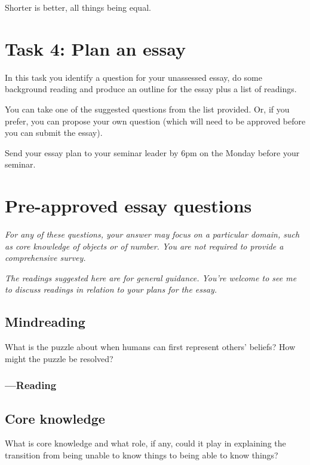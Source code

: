 \documentclass[12pt,\papersize]{extarticle}
\begin{document}
Shorter is better, all things being equal.





\clearpage
\section{Task 4: Plan an essay}
In this task you identify a question for your unassessed essay, do some background reading and produce an outline for the essay plus a list of readings.

You can take one of the suggested questions from the list provided.  Or, if you prefer, you can propose your own question (which will need to be approved before you can submit the essay).

Send your essay plan to your seminar leader by 6pm on the Monday before your seminar.



\clearpage
\section{Pre-approved essay questions}

\textit{For any of these questions, your answer may focus on a particular domain, such as core knowledge of objects or of number.  You are not required to provide a comprehensive survey.}

\emph{The readings suggested here are for general guidance.  You’re welcome to see me to discuss readings in relation to your plans for the essay.}


\subsection{Mindreading}
What is the puzzle about when humans can first represent others’ beliefs?
How might the puzzle be resolved?

\subsubsection{---Reading}







\subsection{Core knowledge}
What is core knowledge and what role, if any, could it play in explaining the transition from being unable to know things to being able to know things?
\end{document}
